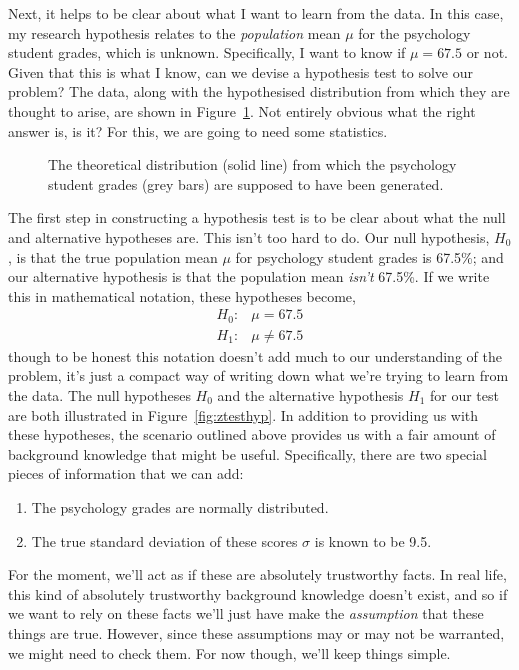 Next, it helps to be clear about what I want to learn from the data. In this case, my research hypothesis relates to the {\it population} mean $\mu$ for the psychology student grades, which is unknown. Specifically, I want to know if $\mu = 67.5$ or not. Given that this is what I know, can we devise a hypothesis test to solve our problem? The data, along with the hypothesised distribution from which they are thought to arise, are shown in Figure~\ref{fig:zeppo}. Not entirely obvious what the right answer is, is it? For this, we are going to need some statistics.
\begin{figure}
\begin{center}
\caption{The theoretical distribution (solid line) from which the psychology student grades (grey bars) are supposed to have been generated.}
\HR
\label{fig:zeppo}
\end{center}
\end{figure}



The first step in constructing a hypothesis test is to be clear about what the null and alternative hypotheses are. This isn't too hard to do. Our null hypothesis, $H_0$, is that the true population mean $\mu$ for psychology student grades is 67.5\%; and our alternative hypothesis is that the population mean {\it isn't} 67.5\%. If we write this in mathematical notation, these hypotheses become,
$$
\begin{array}{ll}
H_0: & \mu = 67.5 \\
H_1: & \mu \neq 67.5
\end{array}
$$
though to be honest this notation doesn't add much to our understanding of the problem, it's just a compact way of writing down what we're trying to learn from the data. The null hypotheses $H_0$ and the alternative hypothesis $H_1$ for our test are both illustrated in Figure~\ref{fig:ztesthyp}. In addition to providing us with these hypotheses, the scenario outlined above provides us with a fair amount of background knowledge that might be useful. Specifically, there are two special pieces of information that we can add:
\begin{enumerate}
\item The psychology grades are normally distributed.
\item The true standard deviation of these scores $\sigma$ is known to be 9.5.
\end{enumerate}
For the moment, we'll act as if these are absolutely trustworthy facts. In real life, this kind of absolutely trustworthy background knowledge doesn't exist, and so if we want to rely on these facts we'll just have make the {\it assumption} that these things are true. However, since these assumptions may or may not be warranted, we might need to check them. For now though, we'll keep things simple.


